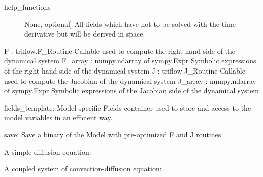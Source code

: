 \documentclass[letterpaper,10pt,english]{sphinxmanual}
\begin{document}
\begin{fulllineitems}
\begin{description}
\begin{description}
\item[{help\_functions}] \leavevmode{[}None, optional{]}
All fields which have not to be solved with the time derivative but will be derived in space.

\end{description}

F : triflow.F\_Routine
Callable used to compute the right hand side of the dynamical system
F\_array : numpy.ndarray of sympy.Expr
Symbolic expressions of the right hand side of the dynamical system
J : triflow.J\_Routine
Callable used to compute the Jacobian of the dynamical system
J\_array : numpy.ndarray of sympy.Expr
Symbolic expressions of the Jacobian side of the dynamical system

fields\_template: Model specific Fields container used to store and access to the model variables in an efficient way.

save: Save a binary of the Model with pre-optimized F and J routines

A simple diffusion equation:

\begin{sphinxVerbatim}[commandchars=\\\{\}]
   
    
\end{sphinxVerbatim}

A coupled system of convection-diffusion equation:

\begin{sphinxVerbatim}[commandchars=\\\{\}]
   
  \PYG{p}{[}
               \PYG{p}{]}
               \PYG{p}{[} \PYG{p}{]} \PYG{p}{[}   \PYG{p}{]}
\end{sphinxVerbatim}


\end{description}
\end{fulllineitems}
\end{document}
